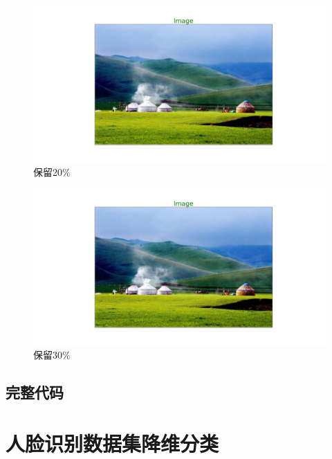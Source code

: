 \documentclass[12pt, a4paper, oneside, fontset=windows]{ctexart}
\begin{document}
\begin{figure}[htbp]
    \centering
    \includegraphics[scale = 0.3]{20.png}
    \caption{保留20\%}
\end{figure}
\begin{figure}[htbp]
    \centering
    \includegraphics[scale = 0.3]{30.png}
    \caption{保留30\%}
\end{figure}
\newpage
\subsection{完整代码}

\section{人脸识别数据集降维分类}
\end{document}
